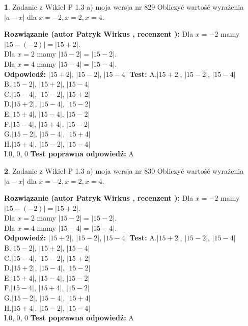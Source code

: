 \documentclass[12pt, a4paper]{article}
\theoremstyle{definition} %
\newtheorem{zad}{}
\newcommand{\zadStart}[1]{\begin{zad}#1\newline}
\newcommand{\zadStop}{\end{zad}}
\newcommand{\rozwStart}[2]{\noindent \textbf{Rozwiązanie (autor #1 , recenzent #2): }\newline}
\newcommand{\rozwStop}{\newline}
\newcommand{\odpStart}{\noindent \textbf{Odpowiedź:}\newline}
\newcommand{\odpStop}{\newline}
\newcommand{\testStart}{\noindent \textbf{Test:}\newline}
\newcommand{\testStop}{\newline}
\newcommand{\kluczStart}{\noindent \textbf{Test poprawna odpowiedź:}\newline}
\newcommand{\kluczStop}{\newline}
\begin{document}
\zadStart{Zadanie z Wikieł P 1.3 a) moja wersja nr 829}
Obliczyć wartość wyrażenia $|a - x|$ dla $x=-2,x=2,x=4$.
\zadStop
\rozwStart{Patryk Wirkus}{}
Dla $x = -2$ mamy $|15 - (-2)| = |15 + 2|$.\\
Dla $x = 2$ mamy $|15 - 2| = |15 - 2|$.\\
Dla $x = 4$ mamy $|15 - 4| = |15 - 4|$.\\
\rozwStop
\odpStart
$|15 + 2|$, $|15 - 2|$, $|15 - 4|$
\odpStop
\testStart
A.$|15 + 2|$, $|15 - 2|$, $|15 - 4|$\\
B.$|15 - 2|$, $|15 + 2|$, $|15 - 4|$\\
C.$|15 - 4|$, $|15 - 2|$, $|15 + 2|$\\
D.$|15 + 2|$, $|15 - 4|$, $|15 - 2|$\\
E.$|15 + 4|$, $|15 - 4|$, $|15 - 2|$\\
F.$|15 - 4|$, $|15 + 4|$, $|15 - 2|$\\
G.$|15 - 2|$, $|15 - 4|$, $|15 + 4|$\\
H.$|15 + 4|$, $|15 - 2|$, $|15 - 4|$\\
I.$0$, $0$, $0$
\testStop
\kluczStart
A
\kluczStop



\zadStart{Zadanie z Wikieł P 1.3 a) moja wersja nr 830}
Obliczyć wartość wyrażenia $|a - x|$ dla $x=-2,x=2,x=4$.
\zadStop
\rozwStart{Patryk Wirkus}{}
Dla $x = -2$ mamy $|15 - (-2)| = |15 + 2|$.\\
Dla $x = 2$ mamy $|15 - 2| = |15 - 2|$.\\
Dla $x = 4$ mamy $|15 - 4| = |15 - 4|$.\\
\rozwStop
\odpStart
$|15 + 2|$, $|15 - 2|$, $|15 - 4|$
\odpStop
\testStart
A.$|15 + 2|$, $|15 - 2|$, $|15 - 4|$\\
B.$|15 - 2|$, $|15 + 2|$, $|15 - 4|$\\
C.$|15 - 4|$, $|15 - 2|$, $|15 + 2|$\\
D.$|15 + 2|$, $|15 - 4|$, $|15 - 2|$\\
E.$|15 + 4|$, $|15 - 4|$, $|15 - 2|$\\
F.$|15 - 4|$, $|15 + 4|$, $|15 - 2|$\\
G.$|15 - 2|$, $|15 - 4|$, $|15 + 4|$\\
H.$|15 + 4|$, $|15 - 2|$, $|15 - 4|$\\
I.$0$, $0$, $0$
\testStop
\kluczStart
A
\kluczStop
\end{document}
